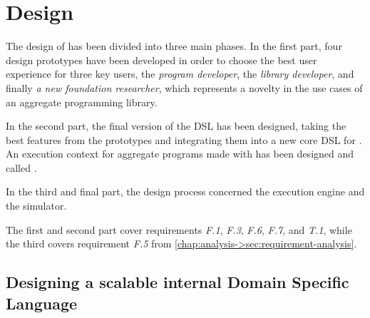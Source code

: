 \chapter{Design}
\label{chap:design}
The design of \this has been divided into three main phases.
%
In the first part, four design prototypes have been developed in order to choose the best user experience for three key users, the \textit{program developer}, the \textit{library developer}, and finally \textit{a new foundation researcher}, which represents a novelty in the use cases of an aggregate programming library.

In the second part, the final version of the \ac{DSL} has been designed, taking the best features from the prototypes and integrating them into a new core \ac{DSL} for \this.
%
An execution context for aggregate programs made with \this has been designed and called .

In the third and final part, the design process concerned the execution engine and the simulator.

The first and second part cover requirements \textit{F.1}, \textit{F.3}, \textit{F.6}, \textit{F.7}, and \textit{T.1}, while the third covers requirement \textit{F.5} from \cref{chap:analysis->sec:requirement-analysis}.

\section{Designing a scalable internal Domain Specific Language} \label{chap:design->sec:dsl}

